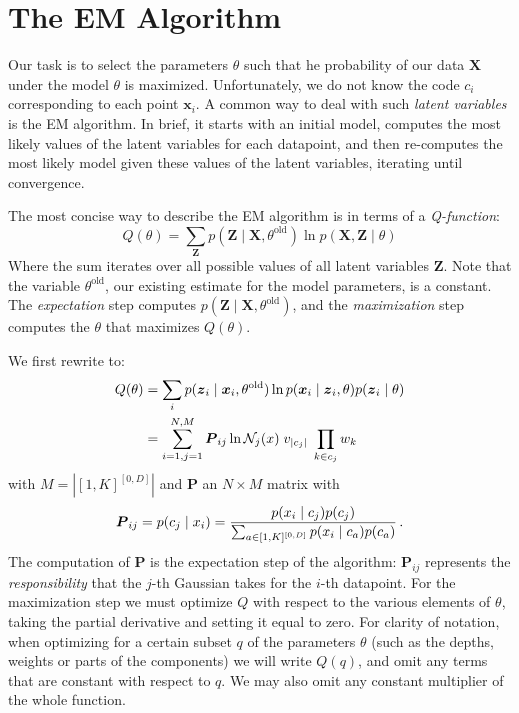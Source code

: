 \documentclass[reprint,amsmath,amssymb,aps,prl]{revtex4-1}
\newcommand{\p}{\mbox{\,.}}
\newcommand{\cN}{{\cal N}}
\newcommand{\bx}{\boldsymbol x}
\newcommand{\bX}{\boldsymbol X}
\newcommand{\bZ}{\boldsymbol Z}
\newcommand{\bz}{\boldsymbol z}
\newcommand{\bP}{\boldsymbol P}
\begin{document}
\section{The EM Algorithm}
\label{section:algorithm}

Our task is to select the parameters $\theta$ such that he probability of our data $\bX$ under the model $\theta$ is maximized. Unfortunately, we do not know the code $c_i$ corresponding to each point $\bx_i$. A common way to deal with such \emph{latent variables} is the EM algorithm. In brief, it starts with an initial model, computes the most likely values of the latent variables for each datapoint, and then re-computes the most likely model given these values of the latent variables, iterating until convergence.

The most concise way to describe the EM algorithm is in terms of a \emph{Q-function}:
\[
Q(\theta) = \sum_{\bZ} p(\bZ \mid \bX, \theta^\text{old}) \ln p(\bX, \bZ \mid \theta) \label{line:q-function}
\]
Where the sum iterates over all possible values of all latent variables $\bZ$. Note that the variable $\theta^\text{old}$, our existing estimate for the model parameters, is a constant. The \emph{expectation} step computes $p(\bZ \mid \bX, \theta^\text{old})$, and the \emph{maximization} step computes the $\theta$ that maximizes $Q(\theta)$. 

We first rewrite to:
\begin{align*}
Q(\theta) &= \sum_{i} p(\bz_i \mid \bx_i, \theta^\text{old}) \ln p(\bx_i \mid \bz_i, \theta) p(\bz_i \mid \theta) \\
     &= \sum_{i=1,j=1}^{N, M} \bP_{ij} \ln \cN_j(x) \;v_{|c_j|}\; \prod_{k\in c_j}w_k 
\end{align*}
with $M = |[1, K]^{[0, D]}|$ and $\bP$ an $N\times M$ matrix with 
\[
\bP_{ij} = p(c_j \mid x_i) = \frac{p(x_i\mid c_j) p(c_j) }{\sum_{a \in [1,K]^{[0, D]}} p(x_i\mid c_a) p(c_a)} \p 
\]
The computation of $\bP$ is the expectation step of the algorithm: $\bP_{ij}$ represents the \emph{responsibility} that the $j$-th Gaussian takes for the $i$-th datapoint. For the maximization step we must optimize $Q$ with respect to the various elements of $\theta$, taking the partial derivative and setting it equal to zero. For clarity of notation, when optimizing for a certain subset $q$ of the parameters $\theta$ (such as the depths, weights or parts of the components) we will write $Q(q)$, and omit any terms that are constant with respect to $q$. We may also omit any constant multiplier of the whole function.
\end{document}
